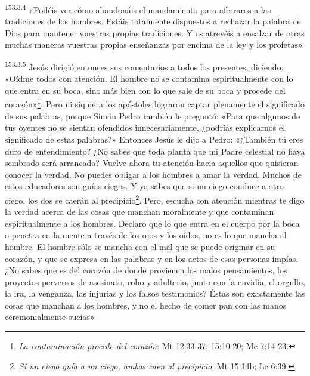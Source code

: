 \par 
\textsuperscript{153:3.4} «Podéis ver cómo abandonáis el mandamiento para aferraros a las tradiciones de los hombres. Estáis totalmente dispuestos a rechazar la palabra de Dios para mantener vuestras propias tradiciones. Y os atrevéis a ensalzar de otras muchas maneras vuestras propias enseñanzas por encima de la ley y los profetas».

\par 
\textsuperscript{153:3.5} Jesús dirigió entonces sus comentarios a todos los presentes, diciendo: «Oídme todos con atención. El hombre no se contamina espiritualmente con lo que entra en su boca, sino más bien con lo que sale de su boca y procede del corazón»\footnote{\textit{La contaminación procede del corazón}: Mt 12:33-37; 15:10-20; Mc 7:14-23.}. Pero ni siquiera los apóstoles lograron captar plenamente el significado de sus palabras, porque Simón Pedro también le preguntó: «Para que algunos de tus oyentes no se sientan ofendidos innecesariamente, ¿podrías explicarnos el significado de estas palabras?» Entonces Jesús le dijo a Pedro: «¿También tú eres duro de entendimiento? ¿No sabes que toda planta que mi Padre celestial no haya sembrado será arrancada? Vuelve ahora tu atención hacia aquellos que quisieran conocer la verdad. No puedes obligar a los hombres a amar la verdad. Muchos de estos educadores son guías ciegos. Y ya sabes que si un ciego conduce a otro ciego, los dos se caerán al precipicio\footnote{\textit{Si un ciego guía a un ciego, ambos caen al precipicio}: Mt 15:14b; Lc 6:39.}. Pero, escucha con atención mientras te digo la verdad acerca de las cosas que manchan moralmente y que contaminan espiritualmente a los hombres. Declaro que lo que entra en el cuerpo por la boca o penetra en la mente a través de los ojos y los oídos, no es lo que mancha al hombre. El hombre sólo se mancha con el mal que se puede originar en su corazón, y que se expresa en las palabras y en los actos de esas personas impías. ¿No sabes que es del corazón de donde provienen los malos pensamientos, los proyectos perversos de asesinato, robo y adulterio, junto con la envidia, el orgullo, la ira, la venganza, las injurias y los falsos testimonios? Éstas son exactamente las cosas que manchan a los hombres, y no el hecho de comer pan con las manos ceremonialmente sucias».

